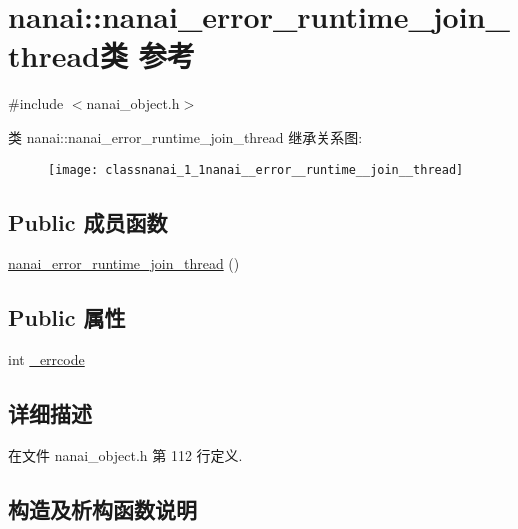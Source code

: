 \hypertarget{classnanai_1_1nanai__error__runtime__join__thread}{}\section{nanai\+:\+:nanai\+\_\+error\+\_\+runtime\+\_\+join\+\_\+thread类 参考}
\label{classnanai_1_1nanai__error__runtime__join__thread}


{\ttfamily \#include $<$nanai\+\_\+object.\+h$>$}

类 nanai\+:\+:nanai\+\_\+error\+\_\+runtime\+\_\+join\+\_\+thread 继承关系图\+:\begin{figure}[H]
\begin{center}
\leavevmode
\texttt{[image: classnanai\_1\_1nanai\_\_error\_\_runtime\_\_join\_\_thread]}
\end{center}
\end{figure}
\subsection*{Public 成员函数}
\begin{DoxyCompactItemize}
\item 
\hyperlink{classnanai_1_1nanai__error__runtime__join__thread_aa6319913367e8964e54866f35c763435}{nanai\+\_\+error\+\_\+runtime\+\_\+join\+\_\+thread} ()
\end{DoxyCompactItemize}
\subsection*{Public 属性}
\begin{DoxyCompactItemize}
\item 
int \hyperlink{classnanai_1_1nanai__error__runtime__join__thread_ad213745f7db3d98b873fb826187ed642}{\+\_\+errcode}
\end{DoxyCompactItemize}


\subsection{详细描述}


在文件 nanai\+\_\+object.\+h 第 112 行定义.



\subsection{构造及析构函数说明}
\hypertarget{classnanai_1_1nanai__error__runtime__join__thread_aa6319913367e8964e54866f35c763435}{}

